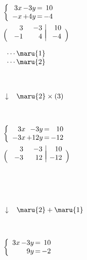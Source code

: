 \documentclass[a4paper,10pt,onecolumn,oneside,notitlepage,final]{jsarticle} %
\begin{document}
\begin{CKdata}
\begin{edaenumerate}
\item\ 
$\left\{\begin{array}{r@{\,}r@{\,=\,}r}
  3x& -3y&  10\\  -x& +4y&  -4
\end{array}\right.$
\item\ 
$\left(\begin{array}{rr|r}
\hspace{6mm}&\hspace{6mm}&\hspace{6mm}\\[-7mm]
   3&  -3&  10\\  -1&   4&  -4
\end{array}\right)$
\item\ 
$\begin{array}{r}
\cdots\maru{1}\\ \cdots\maru{2}
\end{array}$
\item\ \item\ $\downarrow$ $\begin{array}{l}
\maru{2}\times(3)
\end{array}$\item\ 
\item\ 
$\left\{\begin{array}{r@{\,}r@{\,=\,}r}
  3x& -3y&  10\\ -3x&+12y& -12
\end{array}\right.$
\item\ 
$\left(\begin{array}{rr|r}
\hspace{6mm}&\hspace{6mm}&\hspace{6mm}\\[-7mm]
   3&  -3&  10\\  -3&  12& -12
\end{array}\right)$
\item\ 
\item\ \item\ $\downarrow$ $\begin{array}{l}
\maru{2}+\maru{1}
\end{array}$\\[-5mm]\item\ 
\item\ 
$\left\{\begin{array}{r@{\,}r@{\,=\,}r}
  3x& -3y&  10\\    &  9y&  -2
\end{array}\right.$

\end{edaenumerate}
\end{CKdata}
\end{document}
